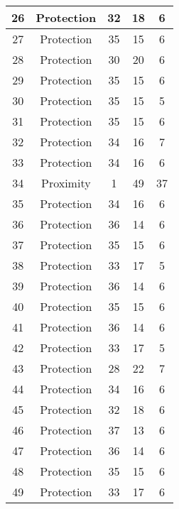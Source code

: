\documentclass[results.tex]{subfiles}
\begin{document}
\begin{center}
\begin{tabular}{| c || c | c | c | c |}
    \hline
    26 & Protection & 32 & 18 & 6 \\ 
    \hline
    27 & Protection & 35 & 15 & 6 \\ 
    \hline
    28 & Protection & 30 & 20 & 6 \\ 
    \hline
    29 & Protection & 35 & 15 & 6 \\ 
    \hline
    30 & Protection & 35 & 15 & 5 \\ 
    \hline
    31 & Protection & 35 & 15 & 6 \\ 
    \hline
    32 & Protection & 34 & 16 & 7 \\ 
    \hline
    33 & Protection & 34 & 16 & 6 \\ 
    \hline
    34 & Proximity & 1 & 49 & 37 \\ 
    \hline
    35 & Protection & 34 & 16 & 6 \\ 
    \hline
    36 & Protection & 36 & 14 & 6 \\ 
    \hline
    37 & Protection & 35 & 15 & 6 \\ 
    \hline
    38 & Protection & 33 & 17 & 5 \\ 
    \hline
    39 & Protection & 36 & 14 & 6 \\ 
    \hline
    40 & Protection & 35 & 15 & 6 \\ 
    \hline
    41 & Protection & 36 & 14 & 6 \\ 
    \hline
    42 & Protection & 33 & 17 & 5 \\ 
    \hline
    43 & Protection & 28 & 22 & 7 \\ 
    \hline
    44 & Protection & 34 & 16 & 6 \\ 
    \hline
    45 & Protection & 32 & 18 & 6 \\ 
    \hline
    46 & Protection & 37 & 13 & 6 \\ 
    \hline
    47 & Protection & 36 & 14 & 6 \\ 
    \hline
    48 & Protection & 35 & 15 & 6 \\ 
    \hline
    49 & Protection & 33 & 17 & 6 \\ 
    \hline   \end{tabular}
\end{center}
\end{document}
